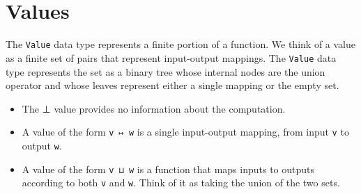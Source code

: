 \begin{fence}
\begin{code}
\AgdaSymbol{;}\AgdaSpace{}%
\AgdaSymbol{;}\<%
\\
\>[61I][@{}l@{\AgdaIndent{0}}]%
\>[9]\AgdaOperator{\AgdaFunction{\#\AgdaUnderscore{}}}\AgdaSymbol{;}\AgdaSpace{}%
\AgdaSymbol{;}\AgdaSpace{}%
\AgdaSymbol{;}\AgdaSpace{}%
\AgdaSymbol{;}\AgdaSpace{}%
\AgdaSymbol{;}\AgdaSpace{}%
\AgdaSymbol{;}\AgdaSpace{}%
\AgdaSymbol{;}\AgdaSpace{}%
\AgdaOperator{\AgdaFunction{\AgdaUnderscore{}[\AgdaUnderscore{}]}}\AgdaSymbol{)}\<%
\\
\>[0]\AgdaSpace{}%
\AgdaSpace{}%
\AgdaSpace{}%
\AgdaSpace{}%
\AgdaSymbol{(}\AgdaSymbol{;}\AgdaSpace{}%
\AgdaSymbol{;}\AgdaSpace{}%
\AgdaSymbol{)}\<%
\end{code}
\end{fence}

\hypertarget{values}{%
\section{Values}\label{values}}

The \texttt{Value} data type represents a finite portion of a function.
We think of a value as a finite set of pairs that represent input-output
mappings. The \texttt{Value} data type represents the set as a binary
tree whose internal nodes are the union operator and whose leaves
represent either a single mapping or the empty set.

\begin{itemize}
\item
  The ⊥ value provides no information about the computation.
\item
  A value of the form \texttt{v\ ↦\ w} is a single input-output mapping,
  from input \texttt{v} to output \texttt{w}.
\item
  A value of the form \texttt{v\ ⊔\ w} is a function that maps inputs to
  outputs according to both \texttt{v} and \texttt{w}. Think of it as
  taking the union of the two sets.
\end{itemize}

